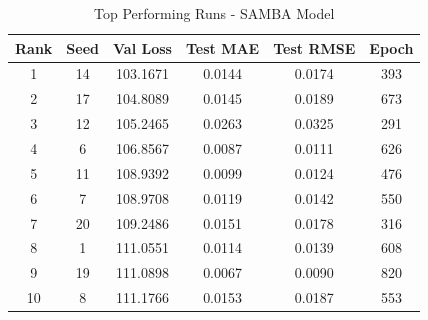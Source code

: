 \begin{table}[ht]
\centering
\caption{Top Performing Runs - SAMBA Model}
\label{tab:samba_results}
\begin{tabular}{cccccc}
\hline
\textbf{Rank} & \textbf{Seed} & \textbf{Val Loss} & \textbf{Test MAE} & \textbf{Test RMSE} & \textbf{Epoch} \\
\hline
1 & 14 & 103.1671 & 0.0144 & 0.0174 & 393 \\
2 & 17 & 104.8089 & 0.0145 & 0.0189 & 673 \\
3 & 12 & 105.2465 & 0.0263 & 0.0325 & 291 \\
4 & 6 & 106.8567 & 0.0087 & 0.0111 & 626 \\
5 & 11 & 108.9392 & 0.0099 & 0.0124 & 476 \\
6 & 7 & 108.9708 & 0.0119 & 0.0142 & 550 \\
7 & 20 & 109.2486 & 0.0151 & 0.0178 & 316 \\
8 & 1 & 111.0551 & 0.0114 & 0.0139 & 608 \\
9 & 19 & 111.0898 & 0.0067 & 0.0090 & 820 \\
10 & 8 & 111.1766 & 0.0153 & 0.0187 & 553 \\
\hline
\end{tabular}
\end{table}
